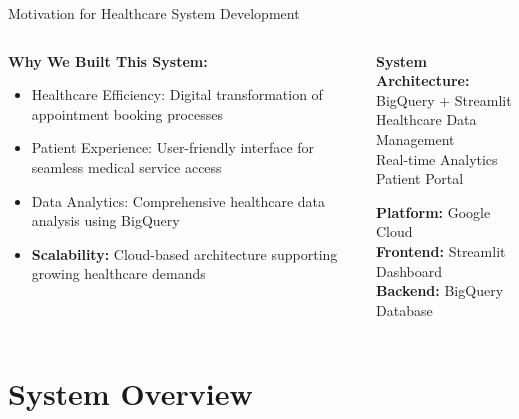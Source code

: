 \documentclass[aspectratio=169]{beamer}
\begin{document}
\begin{frame}{Motivation for Healthcare System Development}
\begin{columns}
\begin{column}{0.6\textwidth}
\textbf{Why We Built This System:}
\begin{itemize}
    \item \textcolor{medicalblue}{Healthcare Efficiency:} Digital transformation of appointment booking processes
    \item \textcolor{medicalgreen}{Patient Experience:} User-friendly interface for seamless medical service access
    \item \textcolor{myred}{Data Analytics:} Comprehensive healthcare data analysis using BigQuery
    \item \textbf{Scalability:} Cloud-based architecture supporting growing healthcare demands
\end{itemize}
\end{column}
\begin{column}{0.4\textwidth}
\begin{center}
\textbf{System Architecture:}\\
BigQuery + Streamlit\\
Healthcare Data Management\\
Real-time Analytics\\
Patient Portal

\vspace{0.5cm}
\textbf{Platform:} Google Cloud\\
\textbf{Frontend:} Streamlit Dashboard\\
\textbf{Backend:} BigQuery Database
\end{center}
\end{column}
\end{columns}
\end{frame}

\section{System Overview}
\end{document}
